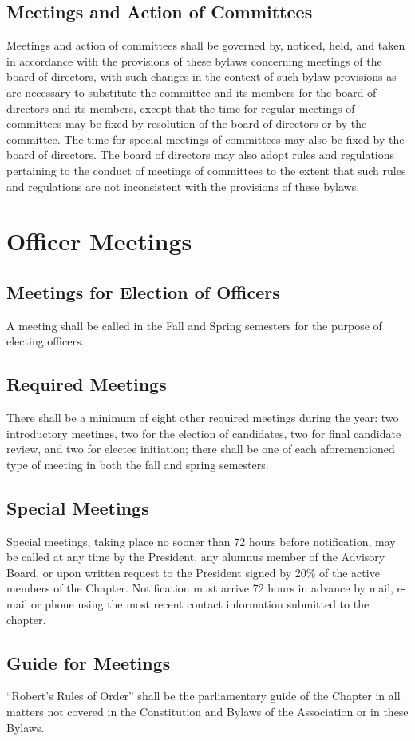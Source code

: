 \documentclass{article}
\begin{document}
	\subsection{Meetings and Action of Committees}
	Meetings and action of committees shall be governed by, noticed, held, and taken in accordance with the provisions of these bylaws concerning meetings of the board of directors, with such changes in the context of such bylaw provisions as are necessary to substitute the committee and its members for the board of directors and its members, except that the time for regular meetings of committees may be fixed by resolution of the board of directors or by the committee. The time for special meetings of committees may also be fixed by the board of directors. The board of directors may also adopt rules and regulations pertaining to the conduct of meetings of committees to the extent that such rules and regulations are not inconsistent with the provisions of these bylaws.
	
	\section{Officer Meetings}
	\subsection{Meetings for Election of Officers}
	A meeting shall be called in the Fall and Spring semesters for the purpose of electing officers.
	\subsection{Required Meetings}
	There shall be a minimum of eight other required meetings during the year: two introductory meetings, two for the election of candidates, two for final candidate review, and two for electee initiation; there shall be one of each aforementioned type of meeting in both the fall and spring semesters.
	\subsection{Special Meetings}
	Special meetings, taking place no sooner than 72 hours before notification, may be called at any time by the President, any alumnus member of the Advisory Board, or upon written request to the President signed by 20\% of the active members of the Chapter. Notification must arrive 72 hours in advance by mail, e-mail or phone using the most recent contact information submitted to the chapter.
	\subsection{Guide for Meetings}
	``Robert's Rules of Order'' shall be the parliamentary guide of the Chapter in all matters not covered in the Constitution and Bylaws of the Association or in these Bylaws.
\end{document}
